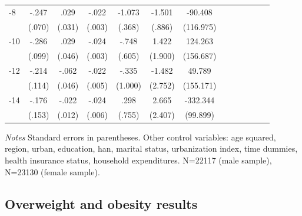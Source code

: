 \begin{table}[p]
\begin{adjustbox}{max width=\linewidth}
\begin{threeparttable}
{\begin{tabular}{l*{6}{SS}}
-8             &    -.247\sym{***}&     .029         &    -.022\sym{***}&   -1.073\sym{***}&   -1.501\sym{*}  &  -90.408         \\
                &   (.070)         &   (.031)         &   (.003)         &   (.368)         &   (.886)         &(116.975)         \\
-10            &    -.286\sym{***}&     .029         &    -.024\sym{***}&    -.748         &    1.422         &  124.263         \\
                &   (.099)         &   (.046)         &   (.003)         &   (.605)         &  (1.900)         &(156.687)         \\
-12           &    -.214\sym{*}  &    -.062         &    -.022\sym{***}&    -.335         &   -1.482         &   49.789         \\
                &   (.114)         &   (.046)         &   (.005)         &  (1.000)         &  (2.752)         &(155.171)         \\
-14           &    -.176         &    -.022\sym{*}  &    -.024\sym{***}&     .298         &    2.665         & -332.344\sym{***}\\
                &   (.153)         &   (.012)         &   (.006)         &   (.755)         &  (2.407)         & (99.899)         \\ 
\bottomrule
\end{tabular}
\begin{tablenotes}
\item \textit{Notes}   Standard errors in parentheses.
Other control variables: age squared, region, urban, education, han, marital status, urbanization index, time dummies, health insurance status, household expenditures. N=22117 (male sample), N=23130 (female sample).
\end{tablenotes}
}
\end{threeparttable}
\end{adjustbox}
\end{table}


\FloatBarrier
\clearpage




\subsection*{Overweight and obesity results}

